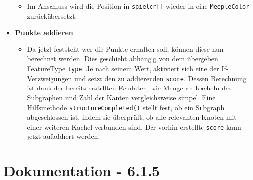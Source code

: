 \begin{itemize}
\begin{itemize}
	
	\item[]
		Im Anschluss wird die Position in \texttt{spieler[]} wieder in eine \texttt{MeepleColor} zurückübersetzt.
	
	\end{itemize}	
	
\clearpage	
	
\item \textbf{Punkte addieren}
	\begin{itemize}
	\item[]
		Da jetzt feststeht wer die Punkte erhalten soll, können diese nun berechnet werden.
		Dies geschieht abhängig von dem übergeben FeatureType \texttt{type}. Je nach seinem Wert, aktiviert sich eine der If-Verzweigungen und setzt den zu addierenden \texttt{score}. Dessen Berechnung ist dank der bereits erstellten 
		Eckdaten, 	wie Menge an Kacheln des Subgraphen und Zahl der Kanten vergleichsweise simpel. Eine Hilfsmethode \texttt{structureCompleted()} stellt fest, ob ein Subgraph abgeschlossen ist, indem sie überprüft, ob alle relevanten 
		Knoten mit einer weiteren Kachel verbunden sind. Der vorhin erstellte \texttt{score} kann jetzt aufaddiert werden.
	
	\end{itemize}		
	
\clearpage
	
\end{itemize}
\section{Dokumentation - 6.1.5}

